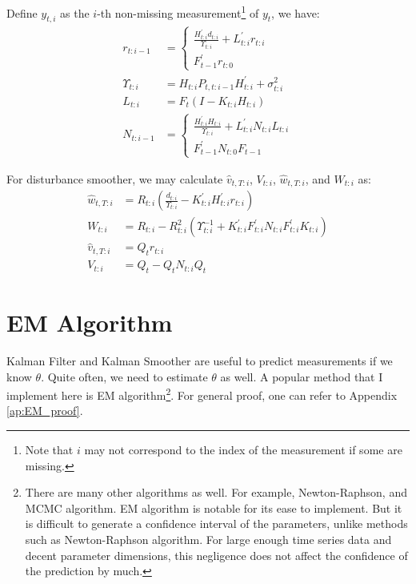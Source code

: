\documentclass[12pt]{article}
\numberwithin{equation}{section}
\begin{document}
Define $y_{t,i}$ as the $i$-th non-missing measurement\footnote{Note that $i$ may not correspond to the index of the measurement if some are missing.} of $y_t$, we have:
\begin{align}
    r_{t:i-1} &= \begin{cases}
        \frac{H_{t:i}^{'}d_{t:i}}{\Upsilon_{t:i}} + L_{t:i}^{'}r_{t:i} \\
        F_{t-1}^{'}r_{t:0} 
    \end{cases} \label{eq:seq_r} \\
    \Upsilon_{t:i} &= H_{t:i}P_{t,t:i-1}H_{t:i}^{'}+\sigma_{t:i}^2 \nonumber \\
    L_{t:i} &= F_t(I-K_{t:i}H_{t:i}) \nonumber \\
    N_{t:i-1} &= \begin{cases}
        \frac{H_{t:i}^{'}H_{t:i}}{\Upsilon_{t:i}} + L_{t:i}^{'}N_{t:i}L_{t:i} \\
        F_{t-1}^{'}N_{t:0}F_{t-1}
    \end{cases} \label{eq:N_seq}
\end{align}

For disturbance smoother, we may calculate $\hat{v}_{t,T:i}$, $V_{t:i}$, $\hat{w}_{t,T:i}$, and $W_{t:i}$ as:
\begin{align}
    \hat{w}_{t,T:i} &= R_{t:i}(\frac{d_{t:i}}{\Upsilon_{t:i}}-K_{t:i}^{'}H_{t:i}^{'}r_{t:i}) \\
    W_{t:i} &= R_{t:i} - R_{t:i}^2(\Upsilon_{t:i}^{-1}+K_{t:i}^{'}F_{t:i}^{'}N_{t:i}F_{t:i}^{'}K_{t:i})  \\
    \hat{v}_{t,T:i} &= Q_tr_{t:i} \\
    V_{t:i} &= Q_t - Q_tN_{t:i}Q_t
\end{align}

\section{EM Algorithm} \label{sec:EM}
Kalman Filter and Kalman Smoother are useful to predict measurements if we know $\theta$. Quite often, we need to estimate $\theta$ as well. A popular method that I implement here is EM algorithm\footnote{There are many other algorithms as well. For example, Newton-Raphson, and MCMC algorithm. EM algorithm is notable for its ease to implement. But it is difficult to generate a confidence interval of the parameters, unlike methods such as Newton-Raphson algorithm. For large enough time series data and decent parameter dimensions, this negligence does not affect the confidence of the prediction by much.}. For general proof, one can refer to Appendix \ref{ap:EM_proof}.
\end{document}

